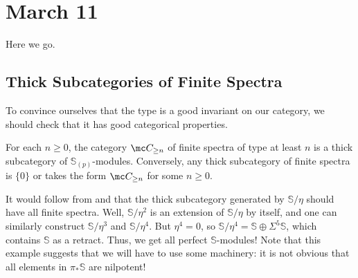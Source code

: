 \documentclass[../notes.tex]{subfiles}
\begin{document}
\section{March 11}
Here we go.

\subsection{Thick Subcategories of Finite Spectra}
To convince ourselves that the type is a good invariant on our category, we should check that it has good categorical properties.
\begin{theorem} \label{thm:thick-finite-subcat}
	For each $n\ge0$, the category $\mc C_{\ge n}$ of finite spectra of type at least $n$ is a thick subcategory of $\mathbb S_{(p)}$-modules. Conversely, any thick subcategory of finite spectra is $\{0\}$ or takes the form $\mc C_{\ge n}$ for some $n\ge0$.
\end{theorem}
\begin{example}
	It would follow from  and  that the thick subcategory generated by $\mathbb S/\eta$ should have all finite spectra. Well, $\mathbb S/\eta^2$ is an extension of $\mathbb S/\eta$ by itself, and one can similarly construct $\mathbb S/\eta^3$ and $\mathbb S/\eta^4$. But $\eta^4=0$, so $\mathbb S/\eta^4=\mathbb S\oplus\Sigma^5\mathbb S$, which contains $\mathbb S$ as a retract. Thus, we get all perfect $\mathbb S$-modules! Note that this example suggests that we will have to use some machinery: it is not obvious that all elements in $\pi_*\mathbb S$ are nilpotent!
\end{example}
\end{document}
